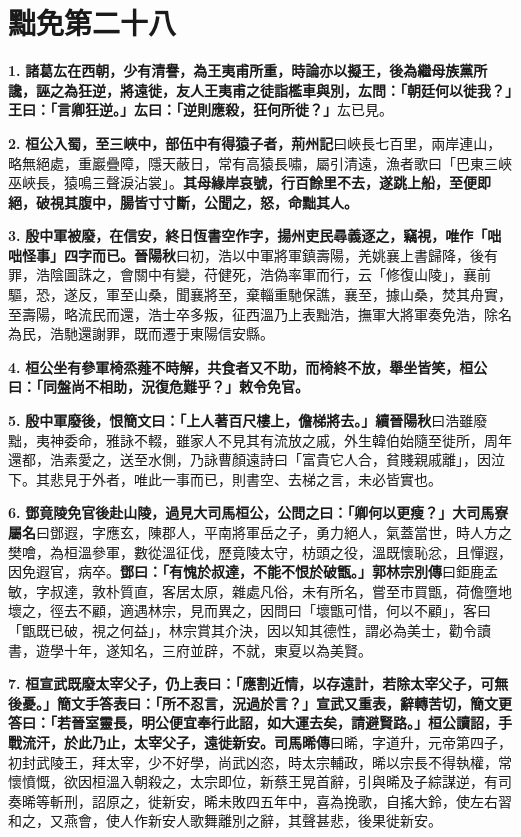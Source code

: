 \chapter{黜免第二十八}

\textbf{1.} \textbf{諸葛厷在西朝，少有清譽，為王夷甫所重，時論亦以擬王，後為繼母族黨所讒，誣之為狂逆，將遠徙，友人王夷甫之徒詣檻車與別，厷問：「朝廷何以徙我？」王曰：「言卿狂逆。」厷曰：「逆則應殺，狂何所徙？」}{\footnotesize 厷已見。}

\textbf{2.} \textbf{桓公入蜀，至三峽中，部伍中有得猿子者，}{\footnotesize \textbf{荊州記}曰峽長七百里，兩岸連山，略無絕處，重巖疊障，隱天蔽日，常有高猿長嘯，屬引清遠，漁者歌曰「巴東三峽巫峽長，猿鳴三聲淚沾裳」。}\textbf{其母緣岸哀號，行百餘里不去，遂跳上船，至便即絕，破視其腹中，腸皆寸寸斷，公聞之，怒，命黜其人。}

\textbf{3.} \textbf{殷中軍被廢，在信安，終日恆書空作字，揚州吏民尋義逐之，竊視，唯作「咄咄怪事」四字而已。}{\footnotesize \textbf{晉陽秋}曰初，浩以中軍將軍鎮壽陽，羌姚襄上書歸降，後有罪，浩陰圖誅之，會關中有變，苻健死，浩偽率軍而行，云「修復山陵」，襄前驅，恐，遂反，軍至山桑，聞襄將至，棄輜重馳保譙，襄至，據山桑，焚其舟實，至壽陽，略流民而還，浩士卒多叛，征西溫乃上表黜浩，撫軍大將軍奏免浩，除名為民，浩馳還謝罪，既而遷于東陽信安縣。}

\textbf{4.} \textbf{桓公坐有參軍椅烝薤不時解，共食者又不助，而椅終不放，舉坐皆笑，桓公曰：「同盤尚不相助，況復危難乎？」敕令免官。}

\textbf{5.} \textbf{殷中軍廢後，恨簡文曰：「上人著百尺樓上，儋梯將去。」}{\footnotesize \textbf{續晉陽秋}曰浩雖廢黜，夷神委命，雅詠不輟，雖家人不見其有流放之戚，外生韓伯始隨至徙所，周年還都，浩素愛之，送至水側，乃詠曹顏遠詩曰「富貴它人合，貧賤親戚離」，因泣下。其悲見于外者，唯此一事而已，則書空、去梯之言，未必皆實也。}

\textbf{6.} \textbf{鄧竟陵免官後赴山陵，過見大司馬桓公，公問之曰：「卿何以更瘦？」}{\footnotesize \textbf{大司馬寮屬名}曰鄧遐，字應玄，陳郡人，平南將軍岳之子，勇力絕人，氣蓋當世，時人方之樊噲，為桓溫參軍，數從溫征伐，歷竟陵太守，枋頭之役，溫既懷恥忿，且憚遐，因免遐官，病卒。}\textbf{鄧曰：「有愧於叔達，不能不恨於破甑。」}{\footnotesize \textbf{郭林宗別傳}曰鉅鹿孟敏，字叔達，敦朴質直，客居太原，雜處凡俗，未有所名，嘗至市買甑，荷儋墮地壞之，徑去不顧，適遇林宗，見而異之，因問曰「壞甑可惜，何以不顧」，客曰「甑既已破，視之何益」，林宗賞其介決，因以知其德性，謂必為美士，勸令讀書，遊學十年，遂知名，三府並辟，不就，東夏以為美賢。}

\textbf{7.} \textbf{桓宣武既廢太宰父子，仍上表曰：「應割近情，以存遠計，若除太宰父子，可無後憂。」簡文手答表曰：「所不忍言，況過於言？」宣武又重表，辭轉苦切，簡文更答曰：「若晉室靈長，明公便宜奉行此詔，如大運去矣，請避賢路。」桓公讀詔，手戰流汗，於此乃止，太宰父子，遠徙新安。}{\footnotesize \textbf{司馬晞傳}曰晞，字道升，元帝第四子，初封武陵王，拜太宰，少不好學，尚武凶恣，時太宗輔政，晞以宗長不得執權，常懷憤慨，欲因桓溫入朝殺之，太宗即位，新蔡王晃首辭，引與晞及子綜謀逆，有司奏晞等斬刑，詔原之，徙新安，晞未敗四五年中，喜為挽歌，自搖大鈴，使左右習和之，又燕會，使人作新安人歌舞離別之辭，其聲甚悲，後果徙新安。}

